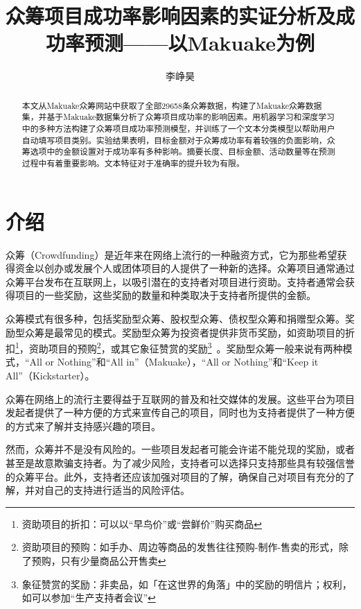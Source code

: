 \documentclass[lang=cn,a4paper]{elegantpaper}
\title{众筹项目成功率影响因素的实证分析及成功率预测——以Makuake为例}
\author{李峥昊}
\institute{{西安交通大学\quad 大数据001}}
\date{\zhtoday}
\begin{document}
\maketitle

\begin{abstract}
\quad\quad 本文从Makuake众筹网站中获取了全部29658条众筹数据，构建了Makuake众筹数据集，并基于Makuake数据集分析了众筹项目成功率的影响因素。用机器学习和深度学习中的多种方法构建了众筹项目成功率预测模型，并训练了一个文本分类模型以帮助用户自动填写项目类别。实验结果表明，目标金额对于众筹成功率有着较强的负面影响，众筹选项中的金额设置对于成功率有多种影响。摘要长度、目标金额、活动数量等在预测过程中有着重要影响。文本特征对于准确率的提升较为有限。
\end{abstract}


\section{介绍}
众筹（Crowdfunding）是近年来在网络上流行的一种融资方式，它为那些希望获得资金以创办或发展个人或团体项目的人提供了一种新的选择。众筹项目通常通过众筹平台发布在互联网上，以吸引潜在的支持者对项目进行资助。支持者通常会获得项目的一些奖励，这些奖励的数量和种类取决于支持者所提供的金额。

众筹模式有很多种，包括奖励型众筹、股权型众筹、债权型众筹和捐赠型众筹。奖励型众筹是最常见的模式。奖励型众筹为投资者提供非货币奖励，如资助项目的折扣\footnote{资助项目的折扣：可以以“早鸟价”或“尝鲜价”购买商品}，资助项目的预购\footnote{资助项目的预购：如手办、周边等商品的发售往往预购-制作-售卖的形式，除了预购，只有少量商品公开售卖}，或其它象征赞赏的奖励\footnote{象征赞赏的奖励：非卖品，如「在这世界的角落」中的奖励的明信片；权利，如可以参加“生产支持者会议”}~\citep{10.1007/978-3-030-29035-1_53}。奖励型众筹一般来说有两种模式，“All or Nothing”和“All in”（Makuake），“All or Nothing”和“Keep it All”（Kickstarter）。

众筹在网络上的流行主要得益于互联网的普及和社交媒体的发展。这些平台为项目发起者提供了一种方便的方式来宣传自己的项目，同时也为支持者提供了一种方便的方式来了解并支持感兴趣的项目。

然而，众筹并不是没有风险的。一些项目发起者可能会许诺不能兑现的奖励，或者甚至是故意欺骗支持者。为了减少风险，支持者可以选择只支持那些具有较强信誉的众筹平台。此外，支持者还应该加强对项目的了解，确保自己对项目有充分的了解，并对自己的支持进行适当的风险评估。
\end{document}
